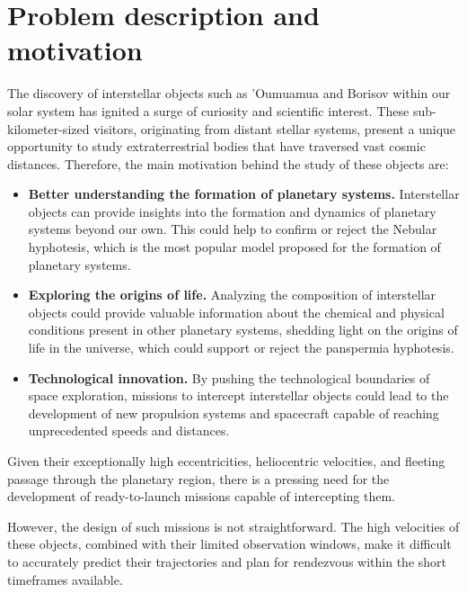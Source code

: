 \section{Problem description and motivation}

The discovery of interstellar objects such as 'Oumuamua and Borisov within our
solar system has ignited a surge of curiosity and scientific interest. These
sub-kilometer-sized visitors, originating from distant stellar systems, present
a unique opportunity to study extraterrestrial bodies that have traversed vast
cosmic distances. Therefore, the main motivation behind the study of these
objects are:

\begin{itemize}

  \item \textbf{Better understanding the formation of planetary systems.}
        Interstellar objects can provide insights into the formation and
        dynamics of planetary systems beyond our own. This could help to
        confirm or reject the Nebular hyphotesis, which is the most popular
        model proposed for the formation of planetary systems.

  \item \textbf{Exploring the origins of life.} Analyzing the composition of
        interstellar objects could provide valuable information about the
        chemical and physical conditions present in other planetary
        systems, shedding light on the origins of life in the universe, which
        could support or reject the panspermia hyphotesis.

  \item \textbf{Technological innovation.} By pushing the technological
        boundaries of space exploration, missions to intercept interstellar
        objects could lead to the development of new propulsion systems and
        spacecraft capable of reaching unprecedented speeds and distances.

\end{itemize}

Given their exceptionally high eccentricities, heliocentric velocities, and
fleeting passage through the planetary region, there is a pressing need for the
development of ready-to-launch missions capable of intercepting them.

However, the design of such missions is not straightforward. The high velocities
of these objects, combined with their limited observation windows, make it
difficult to accurately predict their trajectories and plan for rendezvous
within the short timeframes available.

